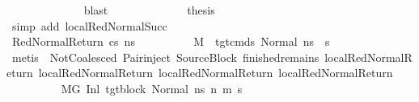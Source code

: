 \begin{isabellebody}
\ \ \ \ \ \ \ \ \ \ \ \ \isamarkupfalse%
\ blast\isanewline
\ \ \ \ \ \ \ \ \ \ \isamarkupfalse%
\ \isamarkupfalse%
\ {\isacharquery}{\kern0pt}thesis\isanewline
\ \ \ \ \ \ \ \ \ \ \ \ \isamarkupfalse%
\ {\isacharparenleft}{\kern0pt}simp\ add{\isacharcolon}{\kern0pt}\ local{\isachardot}{\kern0pt}RedNormalSucc{\isacharparenleft}{\kern0pt}{}{\isacharparenright}{\kern0pt}{\isacharparenright}{\kern0pt}\isanewline
\ \ \ \ \ \ \ \ \isamarkupfalse%
\isanewline
\ \ \ \ \ \ \isamarkupfalse%
\isanewline
\ \ \ \ \ \ \ \ \isamarkupfalse%
\ {\isacharparenleft}{\kern0pt}RedNormalReturn\ cs\ ns{\isacharprime}{\kern0pt}{\isacharparenright}{\kern0pt}\isanewline
\ \ \ \ \ \ \ \ \isamarkupfalse%
\ {\isachardoublequoteopen}M{\isacharcomma}{\kern0pt}{\isasymLambda}{\isacharcomma}{\kern0pt}{\isasymGamma}{\isacharcomma}{\kern0pt}{\isasymOmega}\ {\isasymturnstile}\ {\isasymlangle}tgt{\isacharunderscore}{\kern0pt}cmds{\isacharcomma}{\kern0pt}\ Normal\ ns{\isasymrangle}\ {\isacharbrackleft}{\kern0pt}{\isasymrightarrow}{\isacharbrackright}{\kern0pt}\ s{\isacharprime}{\kern0pt}{\isachardoublequoteclose}\isanewline
\ \ \ \ \ \ \ \ \ \ \isamarkupfalse%
\ {\isacharparenleft}{\kern0pt}metis\ {\isachardoublequoteopen}{}{\isachardoublequoteclose}{\isacharparenleft}{\kern0pt}{}{\isacharparenright}{\kern0pt}\ NotCoalesced\ Pair{\isacharunderscore}{\kern0pt}inject\ SourceBlock\ finished{\isacharunderscore}{\kern0pt}remains\ local{\isachardot}{\kern0pt}RedNormalReturn{\isacharparenleft}{\kern0pt}{}{\isacharparenright}{\kern0pt}\ local{\isachardot}{\kern0pt}RedNormalReturn{\isacharparenleft}{\kern0pt}{}{\isacharparenright}{\kern0pt}\ local{\isachardot}{\kern0pt}RedNormalReturn{\isacharparenleft}{\kern0pt}{}{\isacharparenright}{\kern0pt}\ local{\isachardot}{\kern0pt}RedNormalReturn{\isacharparenleft}{\kern0pt}{}{\isacharparenright}{\kern0pt}{\isacharparenright}{\kern0pt}\isanewline
\ \ \ \ \ \ \ \ \isamarkupfalse%
\ {\isachardoublequoteopen}M{\isacharcomma}{\kern0pt}{\isasymLambda}{\isacharcomma}{\kern0pt}{\isasymGamma}{\isacharcomma}{\kern0pt}{\isasymOmega}{\isacharcomma}{\kern0pt}G{\isacharprime}{\kern0pt}\ {\isasymturnstile}{\isacharparenleft}{\kern0pt}Inl\ tgt{\isacharunderscore}{\kern0pt}block{\isacharcomma}{\kern0pt}\ Normal\ ns{\isacharparenright}{\kern0pt}\ {\isacharminus}{\kern0pt}n{\isasymrightarrow}\ {\isacharparenleft}{\kern0pt}m{\isacharprime}{\kern0pt}{\isacharcomma}{\kern0pt}\ s{\isacharprime}{\kern0pt}{\isacharparenright}{\kern0pt}{\isachardoublequoteclose}\isanewline

\end{isabellebody}
